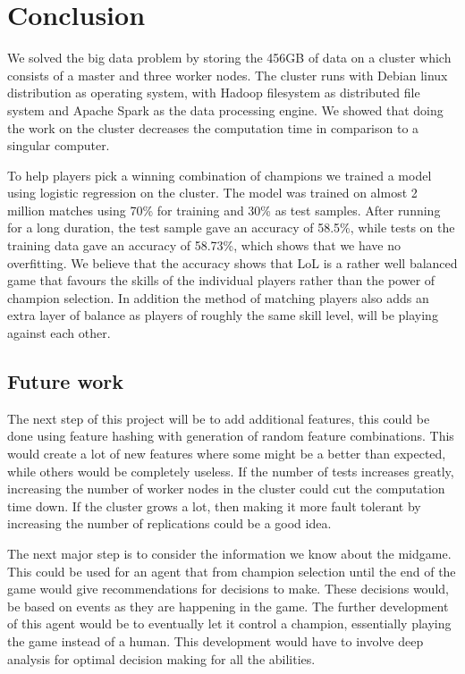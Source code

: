 \section{Conclusion}\label{sec:conclusion}
We solved the big data problem by storing the 456GB of data on a cluster which consists of a master and three worker nodes. The cluster runs with Debian linux distribution as operating system, with Hadoop filesystem as distributed file system and Apache Spark as the data processing engine. We showed that doing the work on the cluster decreases the computation time in comparison to a singular computer.

To help players pick a winning combination of champions we trained a model using logistic regression on the cluster. The model was trained on almost 2 million matches using 70\% for training and 30\% as test samples. After running for a long duration, the test sample gave an accuracy of 58.5\%, while tests on the training data gave an accuracy of 58.73\%, which shows that we have no overfitting. We believe that the accuracy shows that LoL is a rather well balanced game that favours the skills of the individual players rather than the power of champion selection. In addition the method of matching players also adds an extra layer of balance as players of roughly the same skill level, will be playing against each other.

\subsection{Future work}\label{sec:futurework}
The next step of this project will be to add additional features, this could be done using feature hashing with generation of random feature combinations. This would create a lot of new features where some might be a better than expected, while others would be completely useless.
If the number of tests increases greatly, increasing the number of worker nodes in the cluster could cut the computation time down. If the cluster grows a lot, then making it more fault tolerant by increasing the number of replications could be a good idea.

The next major step is to consider the information we know about the midgame. This could be used for an agent that from champion selection until the end of the game would give recommendations for decisions to make. These decisions would, be based on events as they are happening in the game. The further development of this agent would be to eventually let it control a champion, essentially playing the game instead of a human. This development would have to involve deep analysis for optimal decision making for all the abilities.




